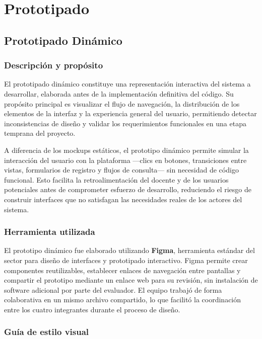 \section{Prototipado}

\subsection{Prototipado Dinámico}

\subsubsection{Descripción y propósito}

El prototipado dinámico constituye una representación interactiva del sistema a
desarrollar, elaborada antes de la implementación definitiva del código. Su propósito
principal es visualizar el flujo de navegación, la distribución de los elementos de
la interfaz y la experiencia general del usuario, permitiendo detectar inconsistencias
de diseño y validar los requerimientos funcionales en una etapa temprana del proyecto.

A diferencia de los mockups estáticos, el prototipo dinámico permite simular la
interacción del usuario con la plataforma ---clics en botones, transiciones entre
vistas, formularios de registro y flujos de consulta--- sin necesidad de código
funcional. Esto facilita la retroalimentación del docente y de los usuarios potenciales
antes de comprometer esfuerzo de desarrollo, reduciendo el riesgo de construir
interfaces que no satisfagan las necesidades reales de los actores del sistema.

\subsubsection{Herramienta utilizada}

El prototipo dinámico fue elaborado utilizando \textbf{Figma}, herramienta estándar del
sector para diseño de interfaces y prototipado interactivo. Figma permite crear
componentes reutilizables, establecer enlaces de navegación entre pantallas y compartir
el prototipo mediante un enlace web para su revisión, sin instalación de software
adicional por parte del evaluador. El equipo trabajó de forma colaborativa en un mismo
archivo compartido, lo que facilitó la coordinación entre los cuatro integrantes durante
el proceso de diseño.

\subsubsection{Guía de estilo visual}

